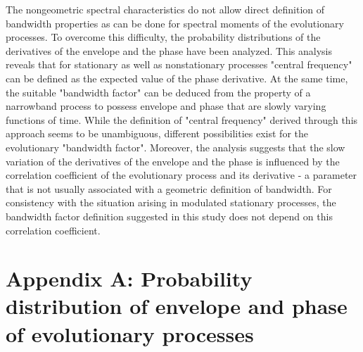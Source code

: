 \documentclass{article}
\begin{document}
The nongeometric spectral characteristics do not allow direct definition of
bandwidth properties as can be done for spectral moments of the evolutionary
processes. To overcome this difficulty, the probability distributions of the
derivatives of the envelope and the phase have been analyzed. This analysis
reveals that for stationary as well as nonstationary processes "central
frequency" can be defined as the expected value of the phase derivative. At
the same time, the suitable "bandwidth factor" can be deduced from the
property of a narrowband process to possess envelope and phase that are slowly
varying functions of time. While the definition of "central frequency" derived
through this approach seems to be unambiguous, different possibilities exist
for the evolutionary "bandwidth factor". Moreover, the analysis suggests that
the slow variation of the derivatives of the envelope and the phase is
influenced by the correlation coefficient of the evolutionary process and its
derivative - a parameter that is not usually associated with a geometric
definition of bandwidth. For consistency with the situation arising in
modulated stationary processes, the bandwidth factor definition suggested in
this study does not depend on this correlation coefficient.

\section*{Appendix A: Probability distribution of envelope and phase of
evolutionary processes}
\end{document}
